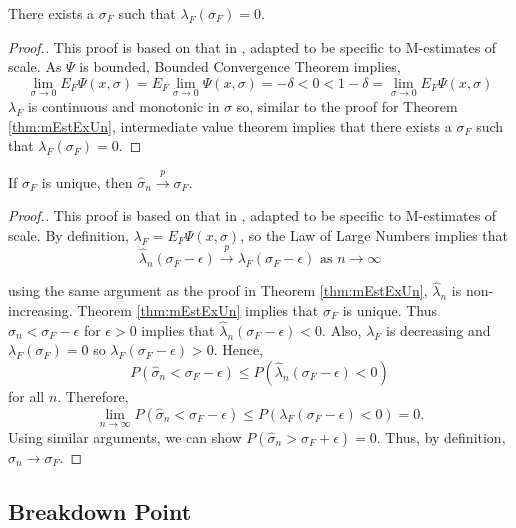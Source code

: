 \begin{thm}
\label{thm:mScaleLemma}
There exists a $\sigma_F$ such that $\lambda_F(\sigma_F) = 0$.
\end{thm} 
\begin{proof}[Proof.]
This proof is based on that in \cite{maronna2019robust}, adapted to be specific to M-estimates of scale. As $\Psi$ is bounded, Bounded Convergence Theorem implies,
$$ \lim_{\sigma\xrightarrow{} 0} E_F \Psi(x,\sigma) = E_F \lim_{\sigma\xrightarrow{} 0} \Psi(x,\sigma)  = -\delta < 0 < 1-\delta =  \lim_{\sigma\xrightarrow{} 0} E_F \Psi(x,\sigma)$$
 $\lambda_F$ is continuous and monotonic in $\sigma$ so, similar to the proof for Theorem \ref{thm:mEstExUn}, intermediate value theorem implies that there exists a $\sigma_F$ such that $\lambda_F(\sigma_F) = 0$.
\end{proof}

\begin{thm}
\label{thm:mScaleConsist} 
If $\sigma_F$ is unique, then $\hat\sigma_n \xrightarrow{p} \sigma_F$.
\end{thm}
\begin{proof}[Proof.]
This proof is based on that in \cite{maronna2019robust}, adapted to be specific to M-estimates of scale. By definition, $\lambda_F = E_F \Psi(x,\sigma)$, so the Law of Large Numbers implies that
$$ \hat\lambda_n(\sigma_F - \epsilon) \xrightarrow{p} \lambda_F(\sigma_F - \epsilon) \text{ as } n \xrightarrow{} \infty$$

using the same argument as the proof in Theorem \ref{thm:mEstExUn}, $\hat\lambda_n$ is non-increasing. Theorem \ref{thm:mEstExUn} implies that $\sigma_F$ is unique. Thus $\hat\sigma_n < \sigma_F - \epsilon$ for $\epsilon > 0$ implies that $\hat\lambda_n(\sigma_F - \epsilon) < 0$.
Also, $\lambda_F$ is decreasing and $\lambda_F(\sigma_F) = 0$ so $\lambda_F(\sigma_F - \epsilon) > 0$. Hence,
$$ P(\hat\sigma_n < \sigma_F - \epsilon) \leq P(\hat\lambda_n(\sigma_F - \epsilon) < 0)$$
for all $n$. Therefore,
$$\lim_{n\xrightarrow{} \infty} P(\hat\sigma_n < \sigma_F - \epsilon)  \leq P(\lambda_F(\sigma_F - \epsilon) < 0) = 0.$$
Using similar arguments, we can show $P(\hat\sigma_n > \sigma_F + \epsilon) = 0$. Thus, by definition, $\hat\sigma_n \xrightarrow{} \sigma_F$.
\end{proof}

\subsection{Breakdown Point}

